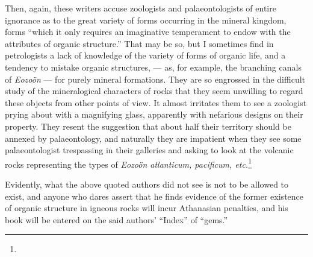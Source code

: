 \documentclass[a4paper, 12pt, oneside]{article}
\begin{document}
Then, again, these writers accuse zoologists and palaeontologists of entire ignorance as to the great variety of forms occurring in the mineral kingdom, forms ``which it only requires an imaginative temperament to endow with the attributes of organic structure.'' That may be so, but I sometimes find in petrologists a lack of knowledge of the variety of forms of organic life, and a tendency to mistake organic structures, --- as, for example, the branching canals of \emph{Eozoön} --- for purely mineral formations. They are so engrossed in the difficult study of the mineralogical characters of rocks that they seem unwilling to regard these objects from other points of view. It almost irritates them to see a zoologist prying about with a magnifying glass, apparently with nefarious designs on their property. They resent the suggestion that about half their territory should be annexed by palaeontology, and naturally they are impatient when they see some palaeontologist trespassing in their galleries and asking to look at the volcanic rocks representing the types of \emph{Eozoön atlanticum, pacificum, etc.}\footnote{}

Evidently, what the above quoted authors did not see is not to be allowed to exist, and anyone who dares assert that he finds evidence of the former existence of organic structure in igneous rocks will incur Athanasian penalties, and his book will be entered on the said authors' ``Index'' of ``gems.''
\end{document}
